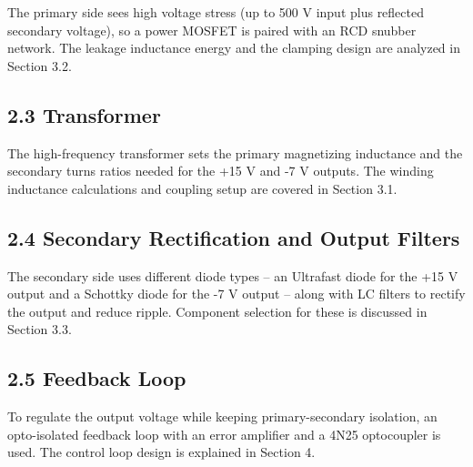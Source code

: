 \documentclass[12pt]{article}
\begin{document}
The primary side sees high voltage stress (up to 500 V input plus reflected secondary voltage), so a power MOSFET is paired with an RCD snubber network. The leakage inductance energy and the clamping design are analyzed in Section 3.2.

\subsection*{2.3 Transformer}

The high-frequency transformer sets the primary magnetizing inductance and the secondary turns ratios needed for the +15 V and -7 V outputs. The winding inductance calculations and coupling setup are covered in Section 3.1.

\subsection*{2.4 Secondary Rectification and Output Filters}

The secondary side uses different diode types -- an Ultrafast diode for the +15 V output and a Schottky diode for the -7 V output -- along with LC filters to rectify the output and reduce ripple. Component selection for these is discussed in Section 3.3.

\subsection*{2.5 Feedback Loop}

To regulate the output voltage while keeping primary-secondary isolation, an opto-isolated feedback loop with an error amplifier and a 4N25 optocoupler is used. The control loop design is explained in Section 4.

\newpage


\newpage


\newpage


\newpage

\end{document}
